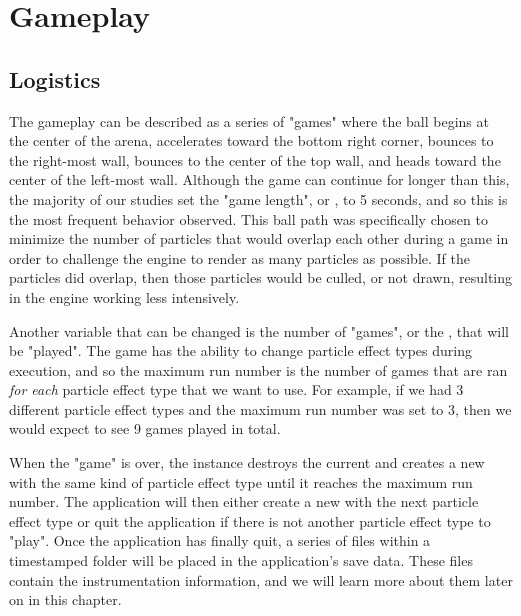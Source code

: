 \section{Gameplay}\label{sec:game_gameplay}

\subsection{Logistics}\label{ssec:game_gameplay_logistics}

The gameplay can be described as a series of "games" where the ball begins at the center of the arena, accelerates toward the bottom right corner, bounces to the right-most wall, bounces to the center of the top wall, and heads toward the center of the left-most wall. Although the game can continue for longer than this, the majority of our studies set the "game length", or , to 5 seconds, and so this is the most frequent behavior observed. This ball path was specifically chosen to minimize the number of particles that would overlap each other during a game in order to challenge the engine to render as many particles as possible. If the particles did overlap, then those particles would be culled, or not drawn, resulting in the engine working less intensively. 

Another variable that can be changed is the number of "games", or the , that will be "played". The game has the ability to change particle effect types during execution, and so the maximum run number is the number of games that are ran \textit{for each} particle effect type that we want to use. For example, if we had 3 different particle effect types and the maximum run number was set to 3, then we would expect to see 9 games played in total.

When the "game" is over, the  instance destroys the current  and creates a new  with the same kind of particle effect type until it reaches the maximum run number. The application will then either create a new  with the next particle effect type or quit the application if there is not another particle effect type to "play". Once the application has finally quit, a series of files within a timestamped folder will be placed in the application's save data. These files contain the instrumentation information, and we will learn more about them later on in this chapter. 

